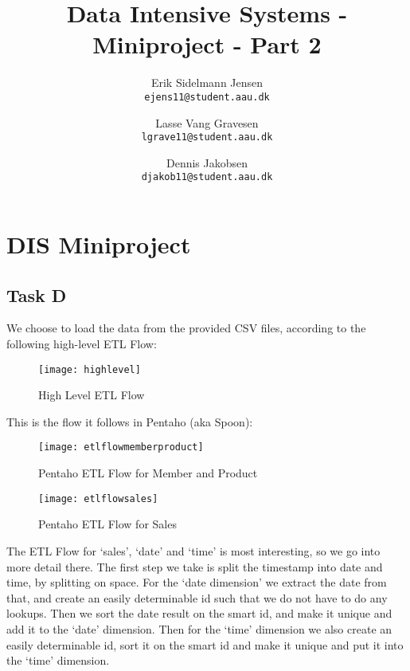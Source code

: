 

\author{
  Erik Sidelmann Jensen\\
  \texttt{ejens11@student.aau.dk}
  \and
  Lasse Vang Gravesen\\
  \texttt{lgrave11@student.aau.dk}
  \and
  Dennis Jakobsen\\
  \texttt{djakob11@student.aau.dk}  
}

\title{Data Intensive Systems - Miniproject - Part 2}
\date{}


	\clearpage\maketitle
	\thispagestyle{empty}
	
	\chapter{DIS Miniproject}
	\section{Task D}
    We choose to load the data from the provided CSV files, according to the following high-level ETL Flow:
    \begin{figure}[H]
    \begin{center}
    \texttt{[image: highlevel]}
    \caption{High Level ETL Flow}
    \label{fig:HighLevelETLFlow}
    \end{center}
    \end{figure}  
    
    This is the flow it follows in Pentaho (aka Spoon):
    
    \begin{figure}[H]
    \begin{center}
    \texttt{[image: etlflowmemberproduct]}
    \caption{Pentaho ETL Flow for Member and Product}
    \label{fig:PentahoETLFlowMemberAndProduct}
    \end{center}
    \end{figure}
    
    \begin{figure}[H]
    \begin{center}
    \texttt{[image: etlflowsales]}
    \caption{Pentaho ETL Flow for Sales}
    \label{fig:PentahoETLFlowSales}
    \end{center}
    \end{figure}
       
    The ETL Flow for `sales', `date' and `time' is most interesting, so we go into more detail there. The first step we take is split the timestamp into date and time, by splitting on space. For the `date dimension' we extract the date from that, and create an easily determinable id such that we do not have to do any lookups. Then we sort the date result on the smart id, and make it unique and add it to the `date' dimension. Then for the `time' dimension we also create an easily determinable id, sort it on the smart id and make it unique and put it into the `time' dimension.
    
